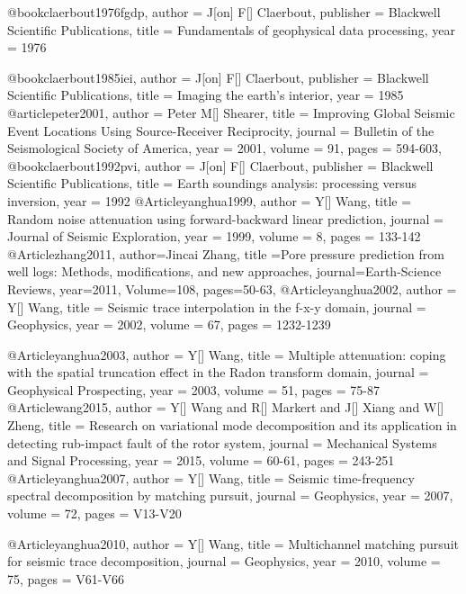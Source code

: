@book{claerbout1976fgdp,
   author = {J[on] F[] Claerbout},
   publisher = {Blackwell Scientific Publications},
   title = {Fundamentals of geophysical data processing},
   year = {1976}
}

@book{claerbout1985iei,
   author = {J[on] F[] Claerbout},
   publisher = {Blackwell Scientific Publications},
   title = {Imaging the earth's interior},
   year = {1985}
}
@article{peter2001,
  author =	 {Peter M[] Shearer},
  title =	 {Improving Global Seismic Event Locations Using Source-Receiver Reciprocity},
  journal = 	 {Bulletin of the Seismological Society of America},
  year = 	 2001,
  volume =	 91,
  pages =	 {594-603},
}
@book{claerbout1992pvi,
   author = {J[on] F[] Claerbout},
   publisher = {Blackwell Scientific Publications},
   title = {Earth soundings analysis: processing versus inversion},
   year = {1992}
}
@Article{yanghua1999,
  author = 	 {Y[] Wang},
  title = 	 {Random noise attenuation using forward-backward linear prediction},
  journal = 	 {Journal of Seismic Exploration},
  year = 	 1999,
  volume =	 8,
  pages =	 {133-142}
}
@Article{zhang2011,
  author={Jincai Zhang},
  title ={Pore pressure prediction from well logs: Methods, modifications, and new approaches},
  journal={Earth-Science Reviews},
  year=2011,
  Volume=108,
  pages={50-63},
}
@Article{yanghua2002,
  author = 	 {Y[] Wang},
  title = 	 {Seismic trace interpolation in the f-x-y domain},
  journal = 	 {Geophysics},
  year = 	 2002,
  volume =	 67,
  pages =	 {1232-1239}
}

@Article{yanghua2003,
  author = 	 {Y[] Wang},
  title = 	 {Multiple attenuation: coping with the spatial truncation effect in the Radon transform domain},
  journal = 	 {Geophysical Prospecting},
  year = 	 2003,
  volume =	 51,
  pages =	 {75-87}
}
@Article{wang2015,
  author = 	 {Y[] Wang and R[] Markert and J[] Xiang and W[] Zheng},
  title = 	 {Research on variational mode decomposition and its application in detecting rub-impact fault of the rotor system},
  journal = 	 {Mechanical Systems and Signal Processing},
  year = 	 2015,
  volume =	 60-61,
  pages =	 {243-251}
}
@Article{yanghua2007,
  author = 	 {Y[] Wang},
  title = 	 {Seismic time-frequency spectral decomposition by matching pursuit},
  journal = 	 {Geophysics},
  year = 	 2007,
  volume =	 72,
  pages =	 {V13-V20}
}

@Article{yanghua2010,
  author = 	 {Y[] Wang},
  title = 	 {Multichannel matching pursuit for seismic trace decomposition},
  journal = 	 {Geophysics},
  year = 	 2010,
  volume =	 75,
  pages =	 {V61-V66}
}

